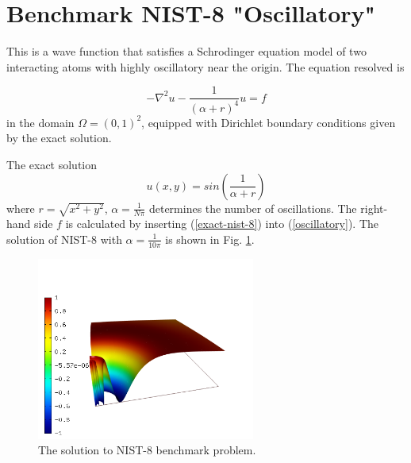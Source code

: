 \section{Benchmark NIST-8 "Oscillatory"}
\label{sec:bench-8}

This is a wave function that satisfies a Schrodinger equation model of two
interacting atoms with highly oscillatory near the origin.
The equation resolved is

\begin{equation} \label{oscillatory}
-\nabla^{2} u - \frac{1}{(\alpha + r)^{4}} u = f
\end{equation}
in the domain $\Omega = (0, 1)^2$, equipped with Dirichlet boundary conditions
given by the exact solution.

The exact solution
\begin{equation}\label{exact-nist-8}
u(x,y) = sin(\frac{1}{\alpha + r})
\end{equation}
where $r = \sqrt{x^{2} + y^{2}}$, $\alpha = \frac{1}{N \pi}$ determines the number of oscillations.
The right-hand side $f$ is calculated by inserting (\ref{exact-nist-8}) into (\ref{oscillatory}).
The solution of NIST-8 with $\alpha = \frac{1}{10 \pi}$ is shown in Fig. \ref{fig:sln-nist08}.

\begin{figure}[!ht]
\centering
\includegraphics[height=6cm]{nist/nist-8/solution.png}
\caption{The solution to NIST-8 benchmark problem.}
\label{fig:sln-nist08}
\end{figure}
